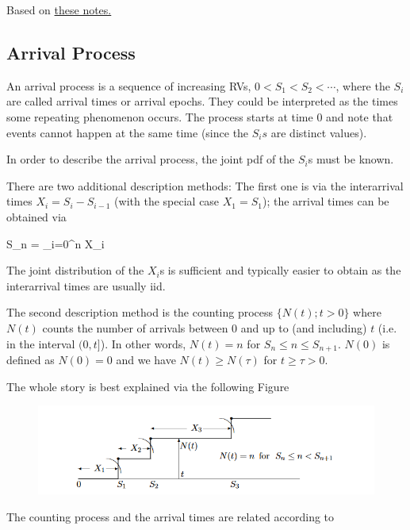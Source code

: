 
Based on \href{https://ocw.mit.edu/courses/electrical-engineering-and-computer-science/6-262-discrete-stochastic-processes-spring-2011/course-notes/MIT6_262S11_chap02.pdf}{these notes.}

\subsection{Arrival Process}

An arrival process is a sequence of increasing RVs, $0 < S_1 < S_2 < \cdots$, where the $S_i$ are called arrival times or arrival epochs. They could be interpreted as the times some repeating phenomenon occurs. The process starts at time $0$ and note that events cannot happen at the same time (since the $S_is$ are distinct values).

In order to describe the arrival process, the joint pdf of the $S_i$s must be known.

There are two additional description methods: The first one is via the interarrival times $X_i = S_i - S_{i-1}$ (with the special case $X_1 = S_1$); the arrival times can be obtained via

\bee
S_n = \sum_{i=0}^n X_i
\eee

The joint distribution of the $X_i$s is sufficient and typically easier to obtain as the interarrival times are usually iid.

The second description method is the counting process $\{N(t); t>0\}$ where $N(t)$ counts the number of arrivals between $0$ and up to (and including) $t$ (i.e. in the interval $(0,t]$). In other words, $N(t) = n$ for $S_n \leq n \leq S_{n+1}$. $N(0)$ is defined as $N(0) = 0$ and we have $N(t) \geq N(\tau)$ for $t \geq \tau > 0$.

The whole story is best explained via the following Figure

\begin{figure}[H]
  \includegraphics[scale=0.8]{images/poisson_process_1_1.png}
\end{figure}

The counting process and the arrival times are related according to

